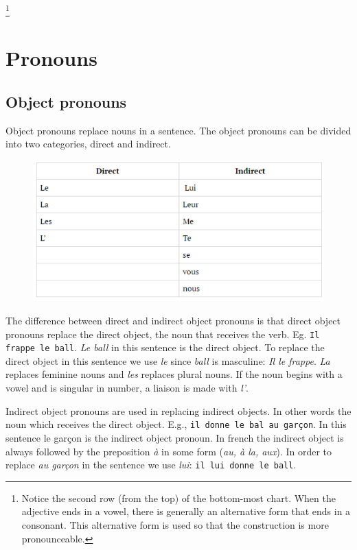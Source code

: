 \documentclass[11pt, oneside]{book}
\begin{document}
{{{\let\thefootnote\relax\footnote{Notice the second row (from the top) of the bottom-most chart. When the adjective ends in a vowel, there is generally an alternative form that ends in a consonant. This alternative form is used so that the construction is more pronounceable.}


\chapter{Pronouns}
\section{Object pronouns}

Object pronouns replace nouns in a sentence. The object pronouns can be divided into two categories, direct and indirect. 

\begin{figure}[H]
	\includegraphics[scale=0.6]{charts/directAndIndirect.png}
\end{figure} \vspace{0.5\baselineskip} 

The difference between direct and indirect object pronouns is that direct object pronouns replace the direct object, the noun that receives the verb. Eg. \texttt{Il frappe le ball}. \textit{Le ball} in this sentence is the direct object. To replace the direct object in this  sentence we use \textit{le} since \textit{ball} is masculine: \textit{Il le frappe}. \textit{La} replaces feminine nouns and \textit{les} replaces plural nouns. If the noun begins with a vowel and is singular in number, a liaison is made with \textit{l'}. \vspace{0.5\baselineskip}

Indirect object pronouns are used in replacing indirect objects. In other words the noun which receives the direct object. E.g., \texttt{il donne le bal au gar\c{c}on}. In this sentence le gar\c{c}on is the indirect object pronoun. In french the indirect object is always followed by the preposition \textit{\`a}  in some form (\textit{au, à la, aux}). In order to replace \textit{au gar\c{c}on} in the sentence we use \textit{lui}: \texttt{il lui donne le ball}.  \vspace{0.5\baselineskip}

}}}
\end{document}
